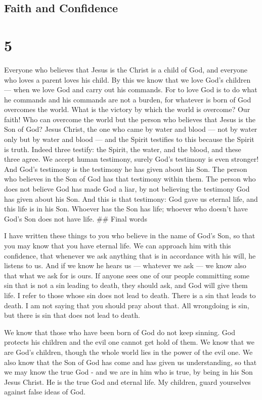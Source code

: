 \hypertarget{faith-and-confidence}{%
\subsection{Faith and Confidence}\label{faith-and-confidence}}

\hypertarget{section-4}{%
\section{5}\label{section-4}}

 Everyone who believes that Jesus is the Christ is a child
of God, and everyone who loves a parent loves his child.  By
this we know that we love God's children --- when we love God and carry
out his commands.  For to love God is to do what he commands
and his commands are not a burden,  for whatever is born of
God overcomes the world. What is the victory by which the world is
overcome? Our faith!  Who can overcome the world but the
person who believes that Jesus is the Son of God?  Jesus
Christ, the one who came by water and blood --- not by water only but by
water and blood --- and the Spirit testifies to this because the Spirit
is truth.  Indeed three testify:  the Spirit,
the water, and the blood, and these three agree.  We accept
human testimony, surely God's testimony is even stronger! And God's
testimony is the testimony he has given about his Son.  The
person who believes in the Son of God has that testimony within them.
The person who does not believe God has made God a liar, by not
believing the testimony God has given about his Son.  And
this is that testimony: God gave us eternal life, and this life is in
his Son.  Whoever has the Son has life; whoever who doesn't
have God's Son does not have life. \#\# Final words

 I have written these things to you who believe in the name
of God's Son, so that you may know that you have eternal life.
 We can approach him with this confidence, that whenever we
ask anything that is in accordance with his will, he listens to us.
 And if we know he hears us --- whatever we ask --- we know
also that what we ask for is ours.  If anyone sees one of
our people committing some sin that is not a sin leading to death, they
should ask, and God will give them life. I refer to those whose sin does
not lead to death. There is a sin that leads to death. I am not saying
that you should pray about that.  All wrongdoing is sin,
but there is sin that does not lead to death.

 We know that those who have been born of God do not keep
sinning. God protects his children and the evil one cannot get hold of
them.  We know that we are God's children, though the whole
world lies in the power of the evil one.  We also know that
the Son of God has come and has given us understanding, so that we may
know the true God - and we are in him who is true, by being in his Son
Jesus Christ. He is the true God and eternal life.  My
children, guard yourselves against false ideas of God.
